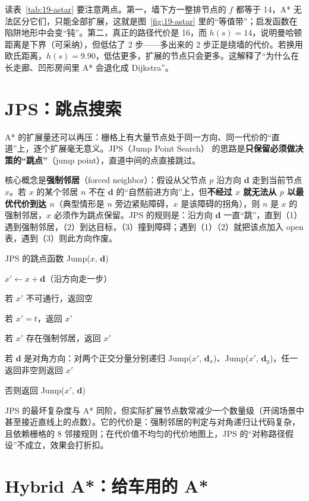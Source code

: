 读表~\ref{tab:19-astar} 要注意两点。第一，墙下方一整排节点的 $f$ 都等于 14，A* 无法区分它们，只能全部扩展，这就是图~\ref{fig:19-astar} 里的“等值带”；启发函数在陷阱地形中会变“钝”。第二，真正的路径代价是 16，而 $h(s)=14$，说明曼哈顿距离是下界（可采纳），但低估了 2 步——多出来的 2 步正是绕墙的代价。若换用欧氏距离，$h(s)=9.90$，低估更多，扩展的节点只会更多。这解释了“为什么在长走廊、凹形房间里 A* 会退化成 Dijkstra”。

\section{JPS：跳点搜索}\label{sec:19-jps}

A* 的扩展量还可以再压：栅格上有大量节点处于同一方向、同一代价的“直道”上，逐个扩展毫无意义。JPS（Jump Point Search）\cite{harabor2011jps} 的思路是\textbf{只保留必须做决策的“跳点”}（jump point），直道中间的点直接跳过。

核心概念是\textbf{强制邻居}（forced neighbor）：假设从父节点 $p$ 沿方向 $\bm{d}$ 走到当前节点 $x$。若 $x$ 的某个邻居 $n$ 不在 $\bm{d}$ 的“自然前进方向”上，但\textbf{不经过 $x$ 就无法从 $p$ 以最优代价到达 $n$}（典型情形是 $n$ 旁边紧贴障碍，$x$ 是该障碍的拐角），则 $n$ 是 $x$ 的强制邻居，$x$ 必须作为跳点保留。JPS 的规则是：沿方向 $\bm{d}$ 一直“跳”，直到（1）遇到强制邻居，（2）到达目标，（3）撞到障碍；遇到（1）（2）就把该点加入 open 表，遇到（3）则此方向作废。

\begin{pseudo}{JPS 的跳点函数 Jump($x$, $\bm{d}$)}
  \item $x' \gets x+\bm{d}$（沿方向走一步）
  \item 若 $x'$ 不可通行，返回空
  \item 若 $x'=t$，返回 $x'$
  \item 若 $x'$ 存在强制邻居，返回 $x'$
  \item 若 $\bm{d}$ 是对角方向：对两个正交分量分别递归 Jump($x'$, $\bm{d}_x$)、Jump($x'$, $\bm{d}_y$)，任一返回非空则返回 $x'$
  \item 否则返回 Jump($x'$, $\bm{d}$)
\end{pseudo}

JPS 的最坏复杂度与 A* 同阶，但实际扩展节点数常减少一个数量级（开阔场景中甚至接近直线上的点数）。它的代价是：强制邻居的判定与对角递归让代码复杂，且依赖栅格的 8 邻接规则；在代价值不均匀的代价地图上，JPS 的“对称路径假设”不成立，效果会打折扣。

\section{Hybrid A*：给车用的 A*}\label{sec:19-hybrid}

